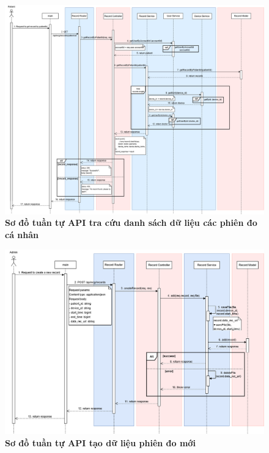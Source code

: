 \begin{figure}[H]
	\centering
	\includegraphics[width=16cm]{Images/api_sequence/record/getRecordByPatientId.drawio.png}
	\caption[Sơ đồ tuần tự API tra cứu danh sách dữ liệu các phiên đo cá nhân]{\bfseries \fontsize{12pt}{0pt}\selectfont Sơ đồ tuần tự API tra cứu danh sách dữ liệu các phiên đo cá nhân}
	\label{sequence_diagram_get_record_by_patient_id}
\end{figure}

\begin{figure}[H]
	\centering
	\includegraphics[width=16cm]{Images/api_sequence/record/createRecord.drawio.png}
	\caption[Sơ đồ tuần tự API tạo dữ liệu phiên đo mới]{\bfseries \fontsize{12pt}{0pt}\selectfont Sơ đồ tuần tự API tạo dữ liệu phiên đo mới}
	\label{sequence_diagram_create_record}
\end{figure}

